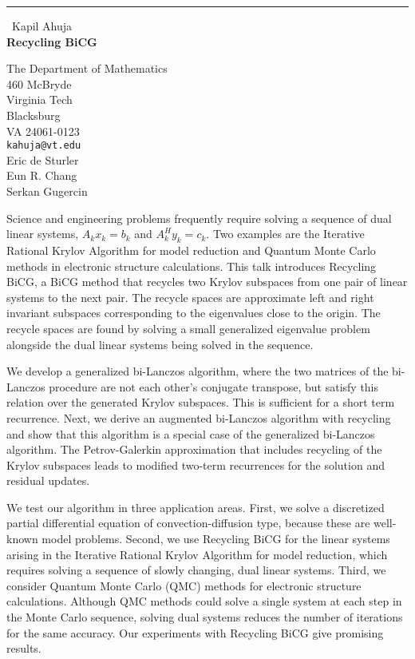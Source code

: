 \documentclass{report}
\begin{document}
\begin{center}
\rule{6in}{1pt} \
{\large Kapil Ahuja \\
{\bf Recycling BiCG}}

The Department of Mathematics \\ 460 McBryde \\ Virginia Tech \\ Blacksburg \\ VA 24061-0123
\\
{\tt kahuja@vt.edu}\\
Eric de Sturler\\
Eun R. Chang\\
Serkan Gugercin\end{center}

Science and engineering problems frequently require solving a
sequence of dual linear systems, $A_k x_k = b_k$ and $A^{H}_k
y_k = c_k$. Two examples are the Iterative Rational Krylov
Algorithm for model reduction and Quantum Monte Carlo methods
in electronic structure calculations. This talk introduces
Recycling BiCG, a BiCG method that recycles two Krylov
subspaces from one pair of linear systems to the next pair. The
recycle spaces are approximate left and right invariant
subspaces corresponding to the eigenvalues close to the origin.
The recycle spaces are found by solving a small generalized
eigenvalue problem alongside the dual linear systems being
solved in the sequence.

We develop a generalized bi-Lanczos algorithm, where the two
matrices of the bi-Lanczos procedure are not each other's
conjugate transpose, but satisfy this relation over the
generated Krylov subspaces. This is sufficient for a short term
recurrence. Next, we derive an augmented bi-Lanczos algorithm
with recycling and show that this algorithm is a special case
of the generalized bi-Lanczos algorithm. The Petrov-Galerkin
approximation that includes recycling of the Krylov subspaces
leads to modified two-term recurrences for the solution and
residual updates.

We test our algorithm in three application areas. First, we
solve a discretized partial differential equation of
convection-diffusion type, because these are well-known model
problems. Second, we use Recycling BiCG for the linear systems
arising in the Iterative Rational Krylov Algorithm for model
reduction, which requires solving a sequence of slowly
changing, dual linear systems. Third, we consider Quantum Monte
Carlo (QMC) methods for electronic structure calculations.
Although QMC methods could solve a single system at each step
in the Monte Carlo sequence, solving dual systems reduces the
number of iterations for the same accuracy. Our experiments
with Recycling BiCG give promising results.
\end{document}
